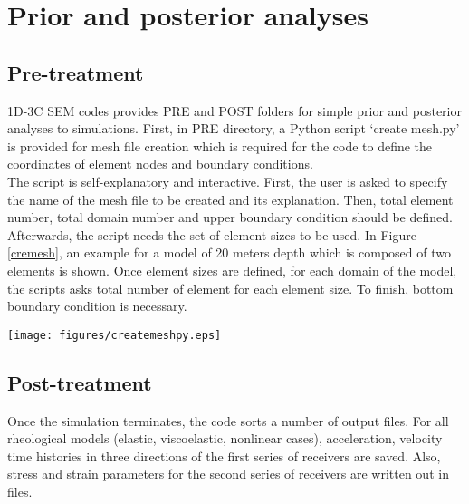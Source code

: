 \chapter{Prior and posterior analyses}

\section{Pre-treatment}

1D-3C SEM codes provides PRE and POST folders for simple prior and posterior analyses to simulations. First, in PRE directory, a Python script ‘create \textunderscore mesh.py’  is provided for mesh file creation which is required for the code to define the coordinates of element nodes and boundary conditions. \\

The script is self-explanatory and interactive. First, the user is asked to specify the name of the mesh file to be created and its explanation. Then, total element number, total domain number and upper boundary condition should be defined. Afterwards, the script needs the set of element sizes to be used. In Figure \ref{cremesh}, an example for a model of 20 meters depth which is composed of two elements is shown. Once element sizes are defined, for each domain of the model, the scripts asks total number of element for each element size. To finish, bottom boundary condition is necessary. \\



\begin{center}
\leavevmode
\texttt{[image: figures/createmeshpy.eps]} 
\label{cremesh} 
\vspace{1cm}
\end{center}



\section{Post-treatment}

\label{sec:prepost}

Once the simulation terminates, the code sorts a number of output files. For all rheological models (elastic, viscoelastic, nonlinear cases), acceleration, velocity time histories in three directions of the first series of receivers are saved. Also, stress and strain parameters for the second series of receivers are written out in files. \\ 

